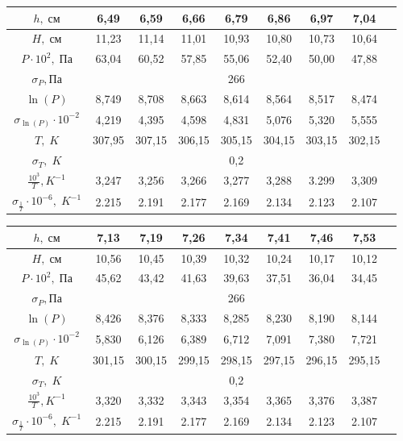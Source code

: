 \documentclass[a4paper, 12pt]{article} %
\begin{document}
\begin{center}
\begin{table}[h]
\begin{tabular}{|c|c|c|c|c|c|c|c|c|}
    \hline 
    $h ,\; {см}$ &  6,49 & 6,59 & 6,66 & 6,79 & 6,86 & 6,97 & 7,04  \\ 
    \hline 
    $H, \; {см}$ &  11,23  & 11,14  & 11,01 & 10,93 & 10,80 & 10,73 & 10,64 \\ 
    \hline 
    $P \cdot 10^2,\; \text{Па}$ &  63,04  & 60,52 & 57,85 & 55,06 & 52,40 & 50,00 & 47,88 \\ 
    \hline 
    $\sigma_{P}, \text{Па}$  & \multicolumn{7}{|c|}{266}  \\
    \hline
    $\ln(P)$ & 8,749 & 8,708 & 8,663 & 8,614 & 8,564 & 8,517 & 8,474\\ 
    \hline 
    $\sigma_{\ln(P)} \cdot 10^{-2}$ & 4,219 & 4,395 & 4,598 & 4,831 & 5,076 & 5,320 & 5,555\\ 
    \hline
    $T , \; {K}$ & 307,95  & 307,15 & 306,15 & 305,15 & 304,15 & 303,15 & 302,15 \\ 
    \hline
    $\sigma_{T},\; {K}$ & \multicolumn{7}{|c|}{0,2} \\
    \hline
    $\frac{10^3}{T},{K}^{-1}$ & 3,247 & 3,256 & 3,266 & 3,277 & 3,288& 3.299 & 3,309\\ 
    \hline 
    $\sigma_{\frac{1}{T}} \cdot 10^{-6}, \; {K}^{-1}$   & 2.215  & 2.191 & 2.177 & 2.169 & 2.134 & 2.123 &  2.107 \\ 
    \hline
\end{tabular} 

\begin{tabular}{|c|c|c|c|c|c|c|c|c|}
    \hline 
    $h ,\; {см}$ &  7,13 & 7,19 & 7,26 & 7,34 & 7,41 & 7,46 & 7,53  \\ 
    \hline 
    $H, \; {см}$ &  10,56  & 10,45  & 10,39 & 10,32 & 10,24 & 10,17 & 10,12  \\ 
    \hline 
    $P \cdot 10^2,\; \text{Па}$ & 45,62 & 43,42 & 41,63 & 39,63 & 37,51 & 36,04 & 34,45 \\ 
    \hline 
    $\sigma_{P}, \text{Па}$  & \multicolumn{7}{|c|}{266}  \\
    \hline
    $\ln(P)$ & 8,426  & 8,376 & 8,333 & 8,285 & 8,230 & 8,190 & 8,144\\ 
    \hline 
    $\sigma_{\ln(P)} \cdot 10^{-2}$ & 5,830 & 6,126 & 6,389 & 6,712 & 7,091 & 7,380 & 7,721\\ 
    \hline
    $T , \; {K}$ & 301,15  & 300,15 & 299,15 & 298,15 & 297,15 & 296,15 & 295,15 \\ 
    \hline
    $\sigma_{T},\; {K}$ & \multicolumn{7}{|c|}{0,2} \\
    \hline
    $\frac{10^3}{T},{K}^{-1}$ & 3,320 & 3,332 & 3,343 & 3,354 & 3,365 & 3,376 & 3,387\\ 
    \hline 
    $\sigma_{\frac{1}{T}} \cdot 10^{-6}, \; {K}^{-1}$   & 2.215  & 2.191 & 2.177 & 2.169 & 2.134 & 2.123 &  2.107 \\ 
    \hline
\end{tabular} 
\end{table}
\end{center}
\end{document}
